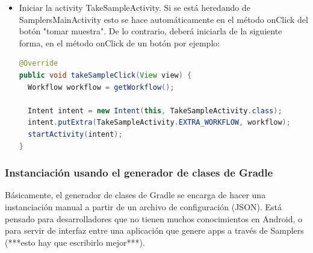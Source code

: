 \begin{itemize}
	\item Iniciar la activity TakeSampleActivity. Si se está heredando de SamplersMainActivity esto se hace automáticamente en el método onClick del botón "tomar muestra". De lo contrario, deberá iniciarla de la siguiente forma, en el método onClick de un botón por ejemplo:
		\begin{lstlisting}[language=Java, frame=tlb]
@Override
public void takeSampleClick(View view) {
  Workflow workflow = getWorkflow();

  Intent intent = new Intent(this, TakeSampleActivity.class);        
  intent.putExtra(TakeSampleActivity.EXTRA_WORKFLOW, workflow);
  startActivity(intent);
}		
		\end{lstlisting}

\end{itemize}


\subsubsection{Instanciación usando el  generador de clases de Gradle}

Básicamente, el generador de clases de Gradle se encarga de hacer una instanciación manual a partir de un archivo de configuración (JSON). Está pensado para desarrolladores que no tienen muchos conocimientos en Android, o para servir de interfaz entre una aplicación que genere apps a través de Samplers (***esto hay que escribirlo mejor***).

